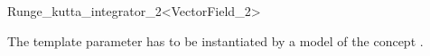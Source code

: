 

\begin{ccRefFunctionObjectClass}{Runge_kutta_integrator_2<VectorField_2>}  %

\ccDefinition

The template parameter  has to
be instantiated by a model of the concept .



\ccIsModel 

 \\

\ccSeeAlso
{} \\
\end{ccRefFunctionObjectClass}


